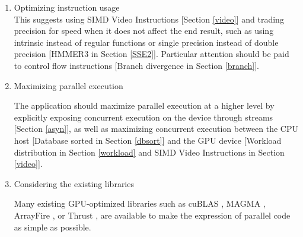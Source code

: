\begin{enumerate}
 \item Optimizing instruction usage\\
 This suggests using SIMD Video Instructions [Section \ref{video}] and trading precision for speed when it does not affect the end result, such as using intrinsic instead of regular functions or single precision instead of double precision [HMMER3 in Section \ref{SSE2}]. Particular attention should be paid to control flow instructions [Branch divergence in Section \ref{branch}].
 
 \item Maximizing parallel execution
 
 The application should maximize parallel execution at a higher level by explicitly exposing concurrent execution on the device through streams [Section \ref{asyn}], as well as maximizing concurrent execution between the CPU host  [Database sorted in Section \ref{dbsort}] and the GPU device [Workload distribution in Section \ref{workload} and SIMD Video Instructions in Section \ref{video}].
 
 \item Considering the existing libraries
 
 Many existing GPU-optimized libraries \citep{CUDAlibs} such as cuBLAS \citep{cuBLAS}, MAGMA \citep{MAGMA}, ArrayFire \citep{ArrayFire}, or Thrust \citep{thrust}, are available to make the expression of parallel code as simple as possible.
 
\end{enumerate}


